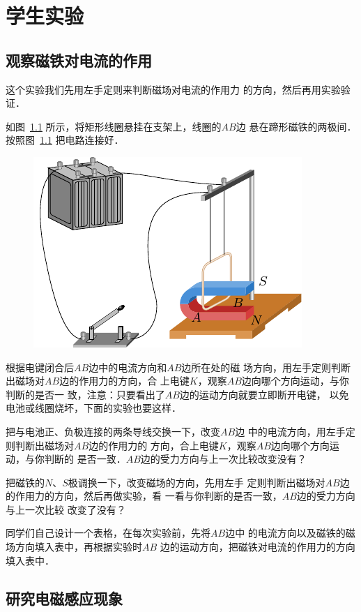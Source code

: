 \chapter{学生实验}

\section{观察磁铁对电流的作用}

这个实验我们先用左手定则来判断磁场对电流的作用力
的方向，然后再用实验验证．

如图~\ref{fig_C_10-1} 所示，将矩形线圈悬挂在支架上，线圈的$AB$边
悬在蹄形磁铁的两极间．按照图~\ref{fig_C_10-1} 把电路连接好．
\begin{figure}[htbp]
    \centering
    \includegraphics{fig/C/10-1.pdf}
    \caption{}\label{fig_C_10-1}
\end{figure}

根据电键闭合后$AB$边中的电流方向和$AB$边所在处的磁
场方向，用左手定则判断出磁场对$AB$边的作用力的方向，合
上电键$K$，观察$AB$边向哪个方向运动，与你判断的是否一
致，注意：只要看出了$AB$边的运动方向就要立即断开电键，
以免电池或线圈烧坏，下面的实验也要这样．

把与电池正、负极连接的两条导线交换一下，改变$AB$边
中的电流方向，用左手定则判断出磁场对$AB$边的作用力的
方向，合上电键$K$，观察$AB$边向哪个方向运动，与你判断的
是否一致．$AB$边的受力方向与上一次比较改变没有？

把磁铁的$N$、$S$极调换一下，改变磁场的方向，先用左手
定则判断出磁场对$AB$边的作用力的方向，然后再做实验，看
一看与你判断的是否一致，$AB$边的受力方向与上一次比较
改变了没有？

同学们自己设计一个表格，在每次实验前，先将$AB$边中
的电流方向以及磁铁的磁场方向填入表中，再根据实验时$AB$
边的运动方向，把磁铁对电流的作用力的方向填入表中．

\section{研究电磁感应现象}

